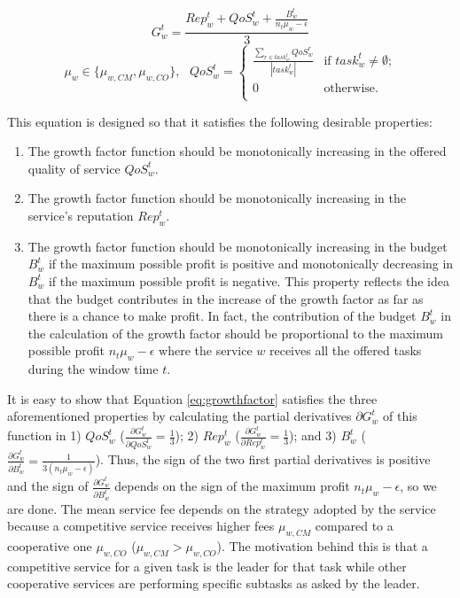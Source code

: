 \begin{equation}\label{eq:growthfactor}
G^t_w = \frac{Rep^t_w + QoS_w^t+\frac{B_w^t}{n_t  \mu_w -
\epsilon}}{3}
\end{equation}
\begin{equation*}
\mu_{w} \in\{\mu_{w, CM}, \mu_{w, CO}\},~~~QoS_w^t =
\begin{cases} \frac{\sum_{r \in
task_w^t}QoS_w^r}{|task_w^t|}& \text{if $task_w^t \neq \emptyset$;}\\
0 & \text{otherwise.}\\
\end{cases}
\end{equation*}


This equation is designed so that it satisfies the following
desirable properties:

\begin{enumerate}

\item The growth factor function should be monotonically
increasing in the offered quality of service $QoS_w^t$.

\item The growth factor function should be monotonically
increasing in the service's reputation $Rep^t_w$.

\item The growth factor function should be monotonically
increasing in the budget $B_w^t$ if the maximum possible profit is
positive and monotonically decreasing in $B_w^t$ if the maximum
possible profit is negative. This property reflects the idea that
the budget contributes in the increase of the growth factor as far
as there is a chance to make profit. In fact, the contribution of
the budget $B_w^t$ in the calculation of the growth factor should
be proportional to the maximum possible profit $n_t \mu_w -
\epsilon$ where the service $w$ receives all the offered tasks
during the window time $t$.

\end{enumerate}

It is easy to show that Equation \ref{eq:growthfactor} satisfies
the three aforementioned properties by calculating the partial
derivatives $\partial G^t_w$ of this function in 1) $QoS_w^t$
($\frac{\partial G^t_w}{\partial QoS_w^t} = \frac{1}{3} $); 2)
$Rep^t_w$ ($\frac{\partial G^t_w}{\partial Rep^t_w} = \frac{1}{3}
$); and 3) $B_w^t$ ($\frac{\partial G^t_w}{\partial B_w^t} =
\frac{1}{3 (n_t \mu_w - \epsilon)} $). Thus, the sign of the two
first partial derivatives is positive and the sign of
$\frac{\partial G^t_w}{\partial B_w^t}$ depends on the sign of the
maximum profit $n_t \mu_w - \epsilon$, so we are done. The mean
service fee depends on the strategy adopted by the service because
a competitive service receives higher fees $\mu_{w, CM}$ compared
to a cooperative one $\mu_{w, CO}$ ($\mu_{w, CM} > \mu_{w, CO}$).
The motivation behind this is that a competitive service for a
given task is the leader for that task while other cooperative
services are performing specific subtasks as asked by the leader.


